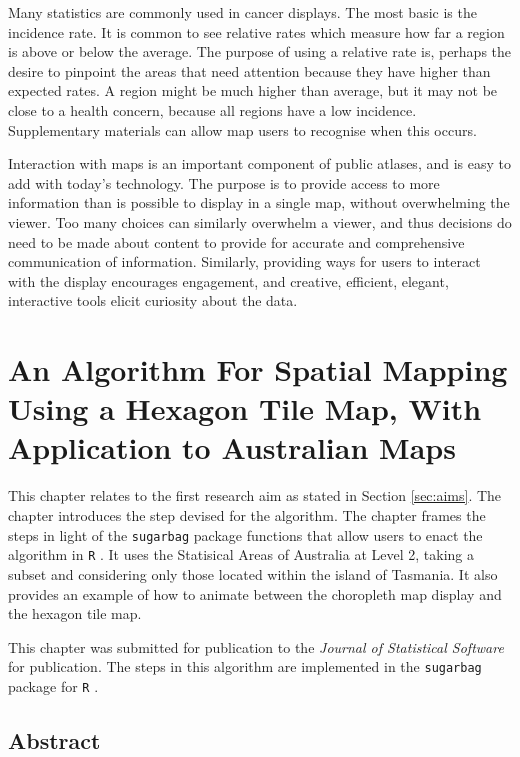 \documentclass{monashthesis}
\begin{document}
Many statistics are commonly used in cancer displays. The most basic is the incidence rate. It is common to see relative rates which measure how far a region is above or below the average. The purpose of using a relative rate is, perhaps the desire to pinpoint the areas that need attention because they have higher than expected rates.
A region might be much higher than average, but it may not be close to a health concern, because all regions have a low incidence. Supplementary materials can allow map users to recognise when this occurs.

Interaction with maps is an important component of public atlases, and is easy to add with today's technology. The purpose is to provide access to more information than is possible to display in a single map, without overwhelming the viewer. Too many choices can similarly overwhelm a viewer, and thus decisions do need to be made about content to provide for accurate and comprehensive communication of information. Similarly, providing ways for users to interact with the display encourages engagement, and creative, efficient, elegant, interactive tools elicit curiosity about the data.

\hypertarget{ch:algorithm}{%
\chapter{An Algorithm For Spatial Mapping Using a Hexagon Tile Map, With Application to Australian Maps}\label{ch:algorithm}}

This chapter relates to the first research aim as stated in Section \ref{sec:aims}.
The chapter introduces the step devised for the algorithm.
The chapter frames the steps in light of the \texttt{sugarbag} \autocite{sugarbag} package functions that allow users to enact the algorithm in \texttt{R} \autocite{R}. It uses the Statisical Areas of Australia at Level 2, taking a subset and considering only those located within the island of Tasmania.
It also provides an example of how to animate between the choropleth map display and the hexagon tile map.

This chapter was submitted for publication to the \emph{Journal of Statistical Software} for publication.
The steps in this algorithm are implemented in the \texttt{sugarbag} \autocite{sugarbag} package for \texttt{R} \autocite{R}.



\hypertarget{abstract-2}{%
\section*{Abstract}\label{abstract-2}}
\end{document}
